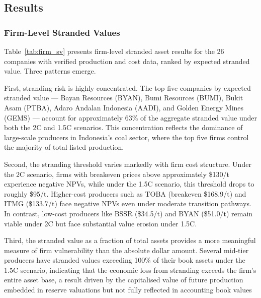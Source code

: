 \subsection{Results}
\label{subsec:model1_results}

\subsubsection{Firm-Level Stranded Values}

Table~\ref{tab:firm_sv} presents firm-level stranded asset results for the 26 companies with verified production and cost data, ranked by expected stranded value. Three patterns emerge.

First, stranding risk is highly concentrated. The top five companies by expected stranded value --- Bayan Resources (BYAN), Bumi Resources (BUMI), Bukit Asam (PTBA), Adaro Andalan Indonesia (AADI), and Golden Energy Mines (GEMS) --- account for approximately 63\% of the aggregate stranded value under both the 2\textdegree C and 1.5\textdegree C scenarios. This concentration reflects the dominance of large-scale producers in Indonesia's coal sector, where the top five firms control the majority of total listed production.

Second, the stranding threshold varies markedly with firm cost structure. Under the 2\textdegree C scenario, firms with breakeven prices above approximately \$130/t experience negative NPVs, while under the 1.5\textdegree C scenario, this threshold drops to roughly \$95/t. Higher-cost producers such as TOBA (breakeven \$168.9/t) and ITMG (\$133.7/t) face negative NPVs even under moderate transition pathways. In contrast, low-cost producers like BSSR (\$34.5/t) and BYAN (\$51.0/t) remain viable under 2\textdegree C but face substantial value erosion under 1.5\textdegree C.

Third, the stranded value as a fraction of total assets provides a more meaningful measure of firm vulnerability than the absolute dollar amount. Several mid-tier producers have stranded values exceeding 100\% of their book assets under the 1.5\textdegree C scenario, indicating that the economic loss from stranding exceeds the firm's entire asset base, a result driven by the capitalised value of future production embedded in reserve valuations but not fully reflected in accounting book values

\begin{landscape}

\end{landscape}

